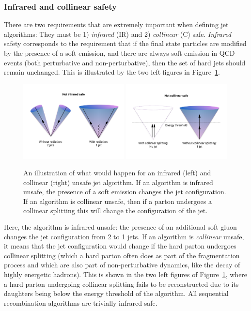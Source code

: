 \subsubsection{Infrared and collinear safety}
\label{sec:objreco:irc}
There are two requirements that are extremely important when defining jet algorithms: They must be 1) \textit{infrared} (IR) and 2) \textit{collinear} (C) safe.
\textit{Infrared} safety corresponds to the requirement that if the final state particles are modified by the presence of a soft emission, and there are always soft emission in QCD events (both perturbative and non-perturbative), then the set of hard jets should remain unchanged. This is illustrated by the two left figures in Figure~\ref{fig:objreco:IRC}.
\begin{figure}[h!] 
    \centering
    \includegraphics[width=0.49\textwidth]{figures/event_reconstruction/IR_safety.pdf}
    \includegraphics[width=0.49\textwidth]{figures/event_reconstruction/Collinear_safety.pdf}
    \caption{An illustration of what would happen for an infrared (left) and collinear (right) unsafe jet algorithm. If an algorithm is infrared unsafe, the presence of a soft emission changes the jet configuration. If an algorithm is collinear unsafe, then if a parton undergoes a collinear splitting this will change the configuration of the jet.}
    \label{fig:objreco:IRC}
\end{figure}
Here, the algorithm is infrared unsafe: the presence of an additional soft gluon changes the jet configuration from 2 to 1 jets. If an algorithm is \textit{collinear} unsafe, it means that the jet configuration would change if the hard parton undergoes collinear splitting (which a hard parton often does as part of the fragmentation process and which are also part of non-perturbative dynamics, like the decay of highly energetic hadrons). This is shown in the two left figures of Figure~\ref{fig:objreco:IRC}, where a hard parton undergoing collinear splitting fails to be reconstructed due to its daughters being below the energy threshold of the algorithm. All sequential recombination algorithms are trivially infrared safe.
 
